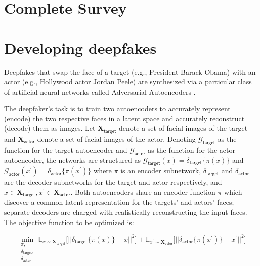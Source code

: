 \documentclass[12pt,letterpaper]{article}
\begin{document}
\section{Complete Survey}\label{sec:all_qs}

\section{Developing deepfakes}\label{sec:makingvids}

Deepfakes that swap the face of a \textsf{target} (e.g., President Barack Obama) with an \textsf{actor} (e.g., Hollywood actor Jordan Peele) are synthesized via a particular class of artificial neural networks called Adversarial Autoencoders \citep{makhzani2015adversarial}. 

The deepfaker's task is to train two autoencoders to accurately represent (encode) the two respective faces in a latent space and accurately reconstruct (decode) them as images. Let $\mathbf{X}_{\textsf{target}}$ denote a set of facial images of the target and $\mathbf{X}_{\textsf{actor}}$ denote a set of facial images of the actor. Denoting $\mathcal{G}_{\textsf{target}}$ as the function for the target autoencoder and $\mathcal{G}_{\textsf{actor}}$ as the function for the actor autoencoder, the networks are structured as $\mathcal{G}_{\textsf{target}}(x) = \delta_{\textsf{target}} \big\{\pi(x) \big\}$ and $\mathcal{G}_{\textsf{actor}}(x^\prime) = \delta_{\textsf{actor}} \big\{\pi(x^\prime) \big\}$ where $\pi$ is an encoder subnetwork, $\delta_{\textsf{target}}$ and $\delta_{\textsf{actor}}$ are the decoder subnetworks for the target and actor respectively, and $x \in \mathbf{X}_{\textsf{target}}, x^\prime \in \mathbf{X}_{\textsf{actor}}$. Both autoencoders share an encoder function $\pi$ which discover a common latent representation for the targets' and actors' faces; separate decoders are charged with realistically reconstructing the input faces. The objective function to be optimized is:

\begin{equation}\label{adversarial}
\min_{ \substack{\pi, \\ \delta_{\textsf{target}}, \\ \delta_{\textsf{actor}} } } \mathbb{E}_{x \sim \mathbf{X}_{\textsf{target}} }\Big[ || \delta_{\textsf{target}} \big\{\pi(x) \big\} - x ||^2 \Big] + \mathbb{E}_{x^\prime \sim \mathbf{X}_{\textsf{actor}} }\Big[ || \delta_{\textsf{actor}} \big\{\pi(x^\prime) \big\} - x^\prime ||^2 \Big]
\end{equation}
\end{document}

